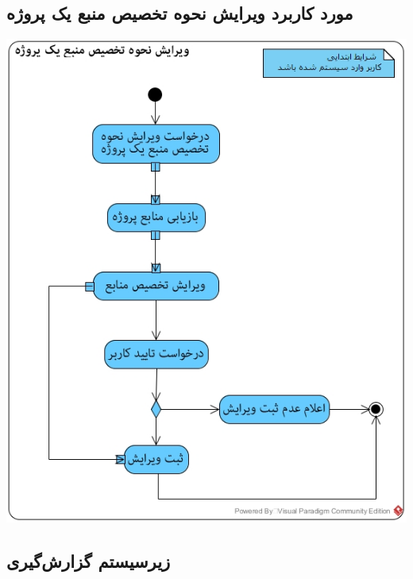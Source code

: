 \subsection*{مورد کاربرد ویرایش نحوه تخصیص منبع یک پروژه}
\vspace{2cm}
\begin{center}
\includegraphics[width=\textwidth]{ActivityDiagrams/39.jpg}
\end{center}



\newpage
\subsection{زیرسیستم گزارش‌گیری}

\vspace{2cm}
